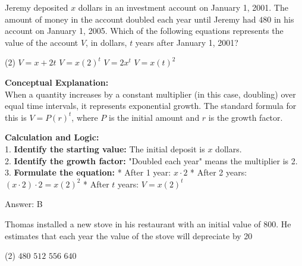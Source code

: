 \documentclass[11pt,paper=a4,answers]{exam}
\begin{document}
\begin{questions}
\pointsinrightmargin
\pointsdroppedatright
\marksnotpoints
{}
\pointformat{\boldmath\themarginpoints}
\bracketedpoints


\question
Jeremy deposited $x$ dollars in an investment account on January 1, 2001. The amount of money in the account doubled each year until Jeremy had $480$ in his account on January 1, 2005. Which of the following equations represents the value of the account $V$, in dollars, $t$ years after January 1, 2001?
\begin{tasks}(2)
    \task $V = x+ 2t$
    \task $V = x(2)^t$
    \task $V = 2x^t$
    \task $V = x(t)^2$
\end{tasks}

\begin{solution}
\textbf{Conceptual Explanation:} \\
When a quantity increases by a constant multiplier (in this case, doubling) over equal time intervals, it represents exponential growth. The standard formula for this is $V = P(r)^t$, where $P$ is the initial amount and $r$ is the growth factor.

\vspace{30pt}

\textbf{Calculation and Logic:} \\
1. \textbf{Identify the starting value:} The initial deposit is $x$ dollars. \\
2. \textbf{Identify the growth factor:} "Doubled each year" means the multiplier is 2. \\
3. \textbf{Formulate the equation:} 
   * After 1 year: $x \cdot 2$
   * After 2 years: $(x \cdot 2) \cdot 2 = x(2)^2$
   * After $t$ years: $V = x(2)^t$

\vspace{30pt}

Answer: \colorbox{yellow!100}{B}
\end{solution}

\vspace{60pt}

\question
Thomas installed a new stove in his restaurant with an initial value of $800$. He estimates that each year the value of the stove will depreciate by 20%
\begin{tasks}(2)
    \task $480$
    \task $512$
    \task $556$
    \task $640$
\end{tasks}


\end{questions}
\end{document}
